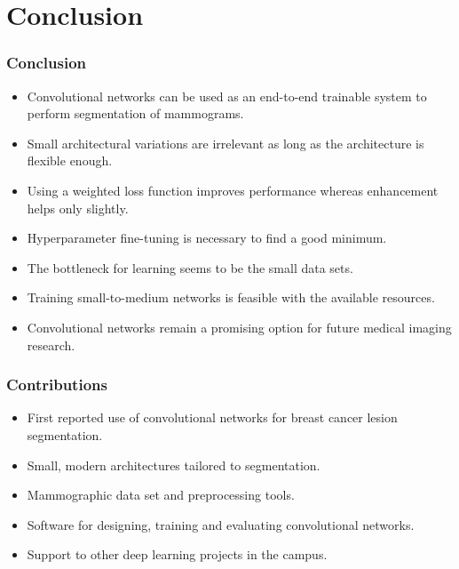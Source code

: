 \documentclass{beamer}
\begin{document}
	\section[Conclusion]{Conclusion}
	\begin{frame}
		\frametitle{Conclusion}
		\begin{itemize}
			\item Convolutional networks can be used as an end-to-end trainable system to perform segmentation of mammograms.
			\item Small architectural variations are irrelevant as long as the architecture is flexible enough.
			\item Using a weighted loss function improves performance whereas enhancement helps only slightly.
			\item Hyperparameter fine-tuning is necessary to find a good minimum.
			\item The bottleneck for learning seems to be the small data sets.
			\item Training small-to-medium networks is feasible with the available resources.
			\item Convolutional networks remain a promising option for future medical imaging research.
		\end{itemize}
	\end{frame}
	
	\begin{frame}
	    \frametitle{Contributions}
	    \begin{itemize}
	        \item First reported use of convolutional networks for breast cancer lesion segmentation.
	        \item Small, modern architectures tailored to segmentation. 
	        \item Mammographic data set and preprocessing tools.
	        \item Software for designing, training and evaluating convolutional networks.
	        \item Support to other deep learning projects in the campus.
	    \end{itemize}
	\end{frame}
	
\end{document}
